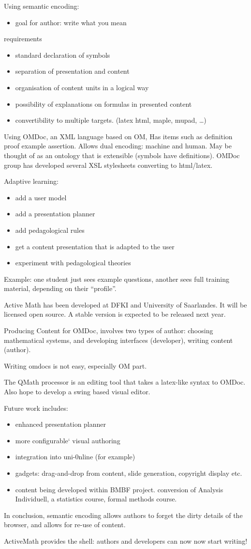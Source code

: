\documentclass[11pt, a4paper]{article}
\begin{document}
Using semantic encoding:
\begin{itemize}
\item goal for author: write what you mean
\end{itemize}
requirements
\begin{itemize}
\item standard declaration of symbols
\item separation of presentation and content
\item organisation of content units in a logical way
\item possibility of explanations on formulas in presented content
\item convertibility to multiple targets. (latex html, maple, mupad, \ldots)
\end{itemize}

Using OMDoc, an XML language based on OM, Has items such as definition
proof example assertion. Allows dual encoding: machine and human.
May be thought of as an ontology that is extensible (symbols have definitions).
OMDoc group has developed several XSL stylesheets converting to html/latex.


Adaptive learning:
\begin{itemize}
\item add a user model
\item add a presentation planner
\item add pedagological rules
\item get a content presentation that is adapted to the user
\item experiment with pedagological theories
\end{itemize}

Example: one student just sees example questions, another sees full
training material, depending on their ``profile''.


Active Math has been developed at DFKI and University of  Saarlandes.
It will be licensed open source. A stable version is expected to be
released next year.

Producing Content for OMDoc, involves two types of author:
choosing mathematical systems, and  developing interfaces
(developer), writing content (author).

Writing omdocs is not easy, especially OM part.

The QMath processor is an editing tool that takes a latex-like syntax to OMDoc.
Also hope to develop a  swing based visual editor.

Future work includes:
\begin{itemize}
\item  enhanced presentation planner
\item more configurable`
visual authoring
\item integration into uni-0nline (for example)
\item gadgets: drag-and-drop from content, slide generation, copyright
  display etc.
\item content being developed within BMBF project.
conversion of Analysis Individuell, a statistics course, formal
methods course.
\end{itemize}

In conclusion,
semantic encoding allows authors to forget the dirty details of the
browser,
and allows for re-use of content.

ActiveMath provides the shell:
authors and developers can now now start writing!
\end{document}
